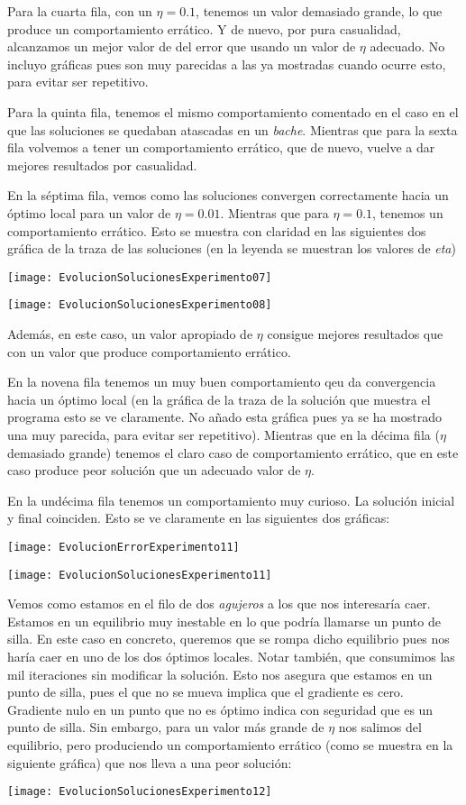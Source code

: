 \documentclass[11pt]{article}
\begin{document}
Para la cuarta fila, con un $\eta = 0.1$, tenemos un valor demasiado grande, lo que produce un comportamiento errático. Y de nuevo, por pura casualidad, alcanzamos un mejor valor de del error que usando un valor de $\eta$ adecuado. No incluyo gráficas pues son muy parecidas a las ya mostradas cuando ocurre esto, para evitar ser repetitivo.

Para la quinta fila, tenemos el mismo comportamiento comentado en el caso en el que las soluciones se quedaban atascadas en un \emph{bache}. Mientras que para la sexta fila volvemos a tener un comportamiento errático, que de nuevo, vuelve a dar mejores resultados por casualidad.

En la séptima fila, vemos como las soluciones convergen correctamente hacia un óptimo local para un valor de $\eta = 0.01$. Mientras que para $\eta = 0.1$, tenemos un comportamiento errático. Esto se muestra con claridad en las siguientes dos gráfica de la traza de las soluciones (en la leyenda se muestran los valores de \emph{eta})

\texttt{[image: EvolucionSolucionesExperimento07]}

\texttt{[image: EvolucionSolucionesExperimento08]}

Además, en este caso, un valor apropiado de $\eta$ consigue mejores resultados que con un valor que produce comportamiento errático.

En la novena fila tenemos un muy buen comportamiento qeu da convergencia hacia un óptimo local (en la gráfica de la traza de la solución que muestra el programa esto se ve claramente. No añado esta gráfica pues ya se ha mostrado una muy parecida, para evitar ser repetitivo). Mientras que en la décima fila ($\eta$ demasiado grande) tenemos el claro caso de comportamiento errático, que en este caso produce peor solución que un adecuado valor de $\eta$.

En la undécima fila tenemos un comportamiento muy curioso. La solución inicial y final coinciden. Esto se ve claramente en las siguientes dos gráficas:

\texttt{[image: EvolucionErrorExperimento11]}

\texttt{[image: EvolucionSolucionesExperimento11]}

Vemos como estamos en el filo de dos \emph{agujeros} a los que nos interesaría caer. Estamos en un equilibrio muy inestable en lo que podría llamarse un punto de silla. En este caso en concreto, queremos que se rompa dicho equilibrio pues nos haría caer en uno de los dos óptimos locales. Notar también, que consumimos las mil iteraciones sin modificar la solución. Esto nos asegura que estamos en un punto de silla, pues el que no se mueva implica que el gradiente es cero. Gradiente nulo en un punto que no es óptimo indica con seguridad que es un punto de silla. Sin embargo, para un valor más grande de $\eta$ nos salimos del equilibrio, pero produciendo un comportamiento errático (como se muestra en la siguiente gráfica) que nos lleva a una peor solución:

\texttt{[image: EvolucionSolucionesExperimento12]}
\end{document}
